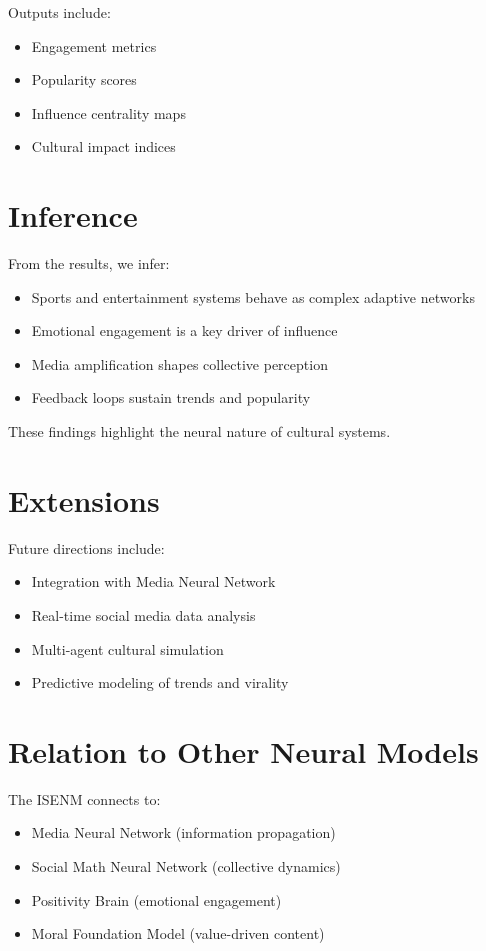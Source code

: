 \documentclass[12pt]{article}
\begin{document}
Outputs include:

\begin{itemize}
\item Engagement metrics
\item Popularity scores
\item Influence centrality maps
\item Cultural impact indices
\end{itemize}

\section{Inference}

From the results, we infer:

\begin{itemize}
\item Sports and entertainment systems behave as complex adaptive networks
\item Emotional engagement is a key driver of influence
\item Media amplification shapes collective perception
\item Feedback loops sustain trends and popularity
\end{itemize}

These findings highlight the neural nature of cultural systems.

\section{Extensions}

Future directions include:

\begin{itemize}
\item Integration with Media Neural Network
\item Real-time social media data analysis
\item Multi-agent cultural simulation
\item Predictive modeling of trends and virality
\end{itemize}

\section{Relation to Other Neural Models}

The ISENM connects to:

\begin{itemize}
\item Media Neural Network (information propagation)
\item Social Math Neural Network (collective dynamics)
\item Positivity Brain (emotional engagement)
\item Moral Foundation Model (value-driven content)
\end{itemize}
\end{document}
